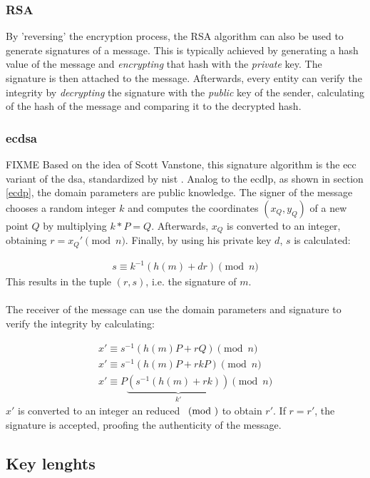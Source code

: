 \subsubsection{RSA}

By 'reversing' the encryption process, the RSA algorithm can also be used to generate signatures of a message.
This is typically achieved by generating a hash value of the message and \textit{encrypting} that hash with the \textit{private} key. The signature is then attached to the
message. Afterwards, every entity can verify the integrity by \textit{decrypting} the signature with the \textit{public} key of the sender, calculating of
the hash of the message and comparing it to the decrypted hash.

\subsubsection{\gls{ecdsa}}

FIXME Based on the idea of Scott Vanstone, this signature algorithm is the \gls{ecc} variant of the \gls{dsa}, standardized by \gls{nist} \cite{nistECDSA}.
Analog to the \gls{ecdlp}, as shown in section \ref{ecdp}, the domain parameters are public knowledge. The signer of the message chooses a random integer $k$ and
computes the coordinates $(x_Q, y_Q)$ of a new point $Q$ by multiplying $k*P = Q$. Afterwards, $x_Q$ is converted to an integer, obtaining $r = x_Q' \pmod n$. Finally,
by using his private key $d$, $s$ is calculated:

\begin{align}\label{ecdsLabel}
s \equiv k^{-1}(h(m)+dr) \pmod n
\end{align}
This results in the tuple $(r,s)$, i.e. the signature of $m$.
\\
\\
The receiver of the message can use the domain parameters and signature to verify the integrity by calculating:

\begin{align*}
 x' \equiv s^{-1}(h(m)P + rQ) \pmod n\\
 x' \equiv s^{-1}(h(m)P + rkP) \pmod n\\
 x' \equiv P \underbrace{(s^{-1}(h(m) + rk))}_{k'} \pmod n
\end{align*}
$x'$ is converted to an integer an reduced $\pmod$ to obtain $r'$. If $r = r'$, the signature is accepted, proofing the authenticity of the message.


\subsection{Key lenghts}

